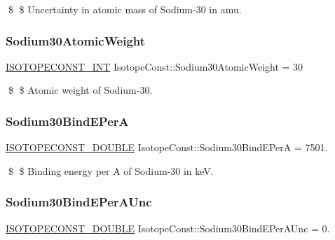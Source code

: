\$ \$ Uncertainty in atomic mass of Sodium-\/30 in amu. \mbox{\label{group___isotope_const-_sodium-_na30_gaf4d45d90d2e2201f318c3cc170253a40}} 
\subsubsection{\texorpdfstring{Sodium30\+Atomic\+Weight}{Sodium30AtomicWeight}}
{\footnotesize\ttfamily \mbox{\hyperlink{group___isotope_const-_macros_ga5f18360b3e99483a35c32d789e62621c}{I\+S\+O\+T\+O\+P\+E\+C\+O\+N\+S\+T\+\_\+\+I\+NT}} Isotope\+Const\+::\+Sodium30\+Atomic\+Weight = 30}

\$ \$ Atomic weight of Sodium-\/30. \mbox{\label{group___isotope_const-_sodium-_na30_gaff9dc0ef601a99efd6ea4b2d3eb2e22e}} 
\subsubsection{\texorpdfstring{Sodium30\+Bind\+E\+PerA}{Sodium30BindEPerA}}
{\footnotesize\ttfamily \mbox{\hyperlink{group___isotope_const-_macros_ga8f45a7272ce02c0b4c65c44636ed719a}{I\+S\+O\+T\+O\+P\+E\+C\+O\+N\+S\+T\+\_\+\+D\+O\+U\+B\+LE}} Isotope\+Const\+::\+Sodium30\+Bind\+E\+PerA = 7501.}

\$ \$ Binding energy per A of Sodium-\/30 in keV. \mbox{\label{group___isotope_const-_sodium-_na30_ga37ee7b040e218eeda93d546ddd5db348}} 
\subsubsection{\texorpdfstring{Sodium30\+Bind\+E\+Per\+A\+Unc}{Sodium30BindEPerAUnc}}
{\footnotesize\ttfamily \mbox{\hyperlink{group___isotope_const-_macros_ga8f45a7272ce02c0b4c65c44636ed719a}{I\+S\+O\+T\+O\+P\+E\+C\+O\+N\+S\+T\+\_\+\+D\+O\+U\+B\+LE}} Isotope\+Const\+::\+Sodium30\+Bind\+E\+Per\+A\+Unc = 0.}

